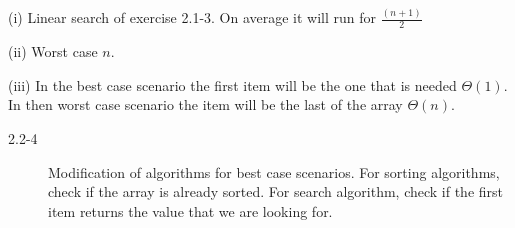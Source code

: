 \begin{description}
 \item[2.2-3] (i) Linear search of exercise 2.1-3. On average it will run for $\frac{(n+1)}{2}$
 \item (ii) Worst case $n$.
 \item (iii) In the best case scenario the first item will be the one that is needed $\Theta$$(1)$. In then
       worst case scenario the item will be the last of the array $\Theta$$(n)$.
\end{description}

\begin{description}
 \item[2.2-4] Modification of algorithms for best case scenarios. For sorting algorithms, check if the array
 is already sorted. For search algorithm, check if the first item returns the value that we are looking for.
\end{description}